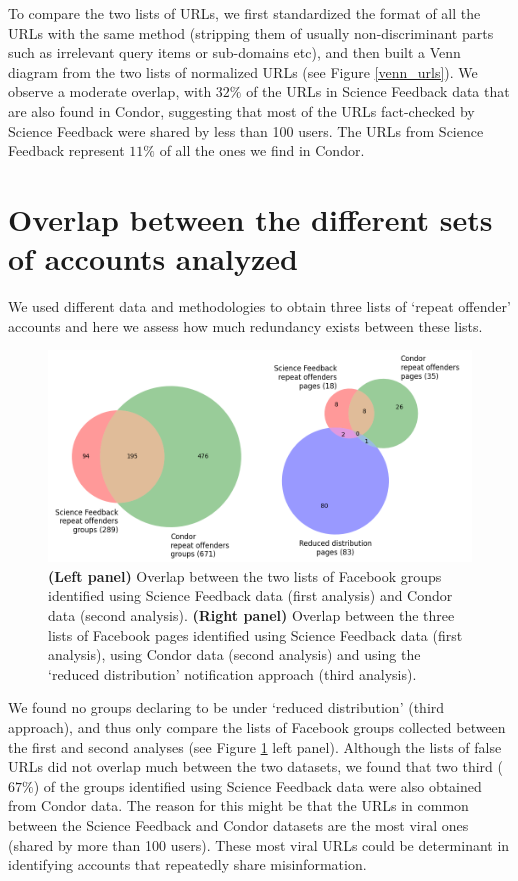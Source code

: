 \documentclass[review]{elsarticle}
\begin{document}
{{To compare the two lists of URLs, we first standardized the format of all the URLs with the same method (stripping them of usually non-discriminant parts such as irrelevant query items or sub-domains etc), and then built a Venn diagram from the two lists of normalized URLs (see Figure \ref{venn_urls}). 
We observe a moderate overlap, with $32\%$ of the URLs in Science Feedback data that are also found in Condor, suggesting that most of the URLs fact-checked by Science Feedback were shared by less than 100 users. 
The URLs from Science Feedback represent $11\%$ of all the ones we find in Condor.

\section*{Overlap between the different sets of accounts analyzed}

We used different data and methodologies to obtain three lists of `repeat offender' accounts and here we assess how much redundancy exists between these lists. 

\begin{figure}[!h]
\centering
\includegraphics[scale=0.5]{./../figure/supplementary_venn_groups_and_pages.png}
\caption{
\textbf{(Left panel)} Overlap between the two lists of Facebook groups identified using Science Feedback data (first analysis) and Condor data (second analysis). \textbf{(Right panel)} Overlap between the three lists of Facebook pages identified using Science Feedback data (first analysis), using Condor data (second analysis) and using the `reduced distribution' notification approach (third analysis).
}
\label{venn_accounts}
\end{figure}

We found no groups declaring to be under ‘reduced distribution’ (third approach), and thus only compare the lists of Facebook groups collected between the first and second analyses (see Figure \ref{venn_accounts} left panel).
Although the lists of false URLs did not overlap much between the two datasets, we found that two third ($67\%$) of the groups identified using Science Feedback data were also obtained from Condor data. 
The reason for this might be that the URLs in common between the Science Feedback and Condor datasets are the most viral ones (shared by more than 100 users). 
These most viral URLs could be determinant in identifying accounts that repeatedly share misinformation.

}}
\end{document}
